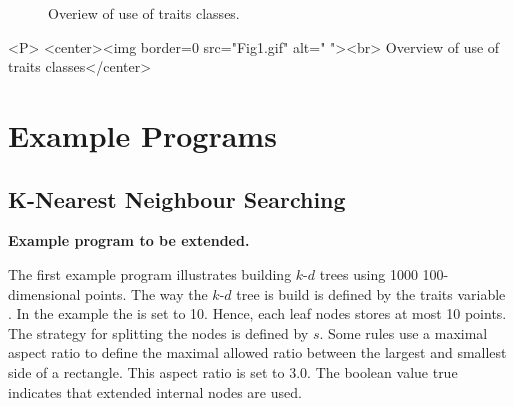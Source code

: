 \begin{ccTexOnly}

\begin{figure} [t]
  \begin{center}
  \leavevmode
  \vspace*{6cm}
  \hspace*{-2cm}
  \end{center}
  \vspace*{-8cm}
  \caption{Overiew of use of traits classes.}
\end{figure}

\end{ccTexOnly}

\begin{ccHtmlOnly}
<P>
<center><img border=0 src="Fig1.gif" alt=" "><br>
Overview of use of traits classes</center>
\end{ccHtmlOnly}

\section{Example Programs}

\subsection{K-Nearest Neighbour Searching}

{\bf Example program to be extended.}

The first example program illustrates building $k$-$d$ trees using 1000
100-dimensional points.
The way the $k$-$d$ tree is build is defined by the traits variable .
In the example the  is set to 10.
Hence, each leaf nodes stores at most 10 points.
The strategy for splitting the nodes is defined by $s$.
Some rules use a maximal aspect ratio to define
the maximal allowed ratio between the largest and smallest side of a rectangle.
This aspect ratio is set to 3.0. The boolean value true indicates that
extended internal nodes are used.

